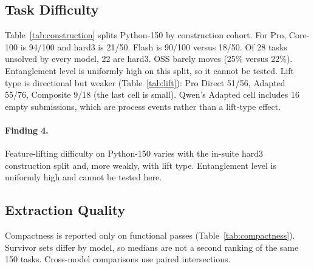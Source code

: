 \subsection{Task Difficulty}
\label{sec:difficulty}

Table~\ref{tab:construction} splits Python-150 by construction cohort.
For Pro, Core-100 is 94/100 and hard3 is 21/50. Flash is 90/100 versus
18/50. Of 28 tasks unsolved by every model, 22 are hard3. OSS barely moves
(25\% versus 22\%). Entanglement level is uniformly high on this split, so
it cannot be tested. Lift type is directional but weaker
(Table~\ref{tab:lift}): Pro Direct 51/56, Adapted 55/76, Composite 9/18
(the last cell is small). Qwen's Adapted cell includes 16 empty submissions,
which are process events rather than a lift-type effect.

\begin{table}[t]
  \caption{Functional Pass by in-suite construction split on Python-150.
  hard3 is not the official Hard-50 expansion.}
  \label{tab:construction}
  \centering
  
\end{table}

\begin{table}[t]
  \caption{Functional Pass by lift type on Python-150. Composite $n=18$.}
  \label{tab:lift}
  \centering
  
\end{table}

\paragraph{Finding 4.}
Feature-lifting difficulty on Python-150 varies with the in-suite hard3
construction split and, more weakly, with lift type. Entanglement level is
uniformly high and cannot be tested here.

\subsection{Extraction Quality}
\label{sec:compactness}

Compactness is reported only on functional passes
(Table~\ref{tab:compactness}). Survivor sets differ by
model, so medians are not a second ranking of the same 150 tasks. Cross-model
comparisons use paired intersections.

\begin{table}[t]
  \caption{Pass-conditioned compactness on freeze~v2 Python-150.
  RRES is submission LOC / reference LOC. Copy-heavy and compact are
  exclusive classes on the passing subset.}
  \label{tab:compactness}
  \centering
  
\end{table}

